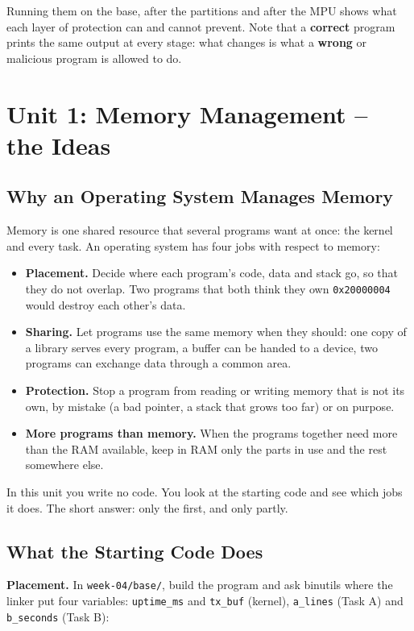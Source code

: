 Running them on the base, after the partitions and after the MPU shows what each layer of protection can and cannot prevent. Note that a \textbf{correct} program prints the same output at every stage: what changes is what a \textbf{wrong} or malicious program is allowed to do.

\section{Unit 1: Memory Management -- the Ideas}

\subsection{Why an Operating System Manages Memory}

Memory is one shared resource that several programs want at once: the kernel and every task. An operating system has four jobs with respect to memory:

\begin{itemize}
    \item \textbf{Placement.} Decide where each program's code, data and stack go, so that they do not overlap. Two programs that both think they own \texttt{0x20000004} would destroy each other's data.
    \item \textbf{Sharing.} Let programs use the same memory when they should: one copy of a library serves every program, a buffer can be handed to a device, two programs can exchange data through a common area.
    \item \textbf{Protection.} Stop a program from reading or writing memory that is not its own, by mistake (a bad pointer, a stack that grows too far) or on purpose.
    \item \textbf{More programs than memory.} When the programs together need more than the RAM available, keep in RAM only the parts in use and the rest somewhere else.
\end{itemize}

In this unit you write no code. You look at the starting code and see which jobs it does. The short answer: only the first, and only partly.

\subsection{What the Starting Code Does}

\textbf{Placement.} In \texttt{week-04/base/}, build the program and ask binutils where the linker put four variables: \texttt{uptime\_ms} and \texttt{tx\_buf} (kernel), \texttt{a\_lines} (Task A) and \texttt{b\_seconds} (Task B):

